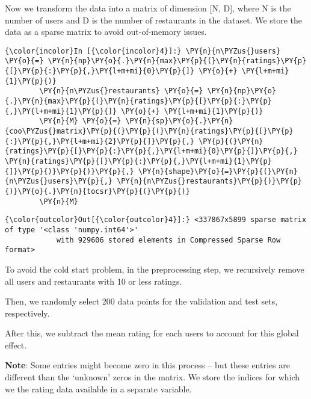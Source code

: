     Now we transform the data into a matrix of dimension {[}N, D{]}, where N
is the number of users and D is the number of restaurants in the
dataset. We store the data as a sparse matrix to avoid out-of-memory
issues.

    \begin{Verbatim}[commandchars=\\\{\}]
{\color{incolor}In [{\color{incolor}4}]:} \PY{n}{n\PYZus{}users} \PY{o}{=} \PY{n}{np}\PY{o}{.}\PY{n}{max}\PY{p}{(}\PY{n}{ratings}\PY{p}{[}\PY{p}{:}\PY{p}{,}\PY{l+m+mi}{0}\PY{p}{]} \PY{o}{+} \PY{l+m+mi}{1}\PY{p}{)}
        \PY{n}{n\PYZus{}restaurants} \PY{o}{=} \PY{n}{np}\PY{o}{.}\PY{n}{max}\PY{p}{(}\PY{n}{ratings}\PY{p}{[}\PY{p}{:}\PY{p}{,}\PY{l+m+mi}{1}\PY{p}{]} \PY{o}{+} \PY{l+m+mi}{1}\PY{p}{)}
        \PY{n}{M} \PY{o}{=} \PY{n}{sp}\PY{o}{.}\PY{n}{coo\PYZus{}matrix}\PY{p}{(}\PY{p}{(}\PY{n}{ratings}\PY{p}{[}\PY{p}{:}\PY{p}{,}\PY{l+m+mi}{2}\PY{p}{]}\PY{p}{,} \PY{p}{(}\PY{n}{ratings}\PY{p}{[}\PY{p}{:}\PY{p}{,}\PY{l+m+mi}{0}\PY{p}{]}\PY{p}{,} \PY{n}{ratings}\PY{p}{[}\PY{p}{:}\PY{p}{,}\PY{l+m+mi}{1}\PY{p}{]}\PY{p}{)}\PY{p}{)}\PY{p}{,} \PY{n}{shape}\PY{o}{=}\PY{p}{(}\PY{n}{n\PYZus{}users}\PY{p}{,} \PY{n}{n\PYZus{}restaurants}\PY{p}{)}\PY{p}{)}\PY{o}{.}\PY{n}{tocsr}\PY{p}{(}\PY{p}{)}
        \PY{n}{M}
\end{Verbatim}

\begin{Verbatim}[commandchars=\\\{\}]
{\color{outcolor}Out[{\color{outcolor}4}]:} <337867x5899 sparse matrix of type '<class 'numpy.int64'>'
        	with 929606 stored elements in Compressed Sparse Row format>
\end{Verbatim}
            
    To avoid the cold start problem, in the preprocessing step, we
recursively remove all users and restaurants with 10 or less ratings.

Then, we randomly select 200 data points for the validation and test
sets, respectively.

After this, we subtract the mean rating for each users to account for
this global effect.

\textbf{Note}: Some entries might become zero in this process -- but
these entries are different than the `unknown' zeros in the matrix. We
store the indices for which we the rating data available in a separate
variable.

